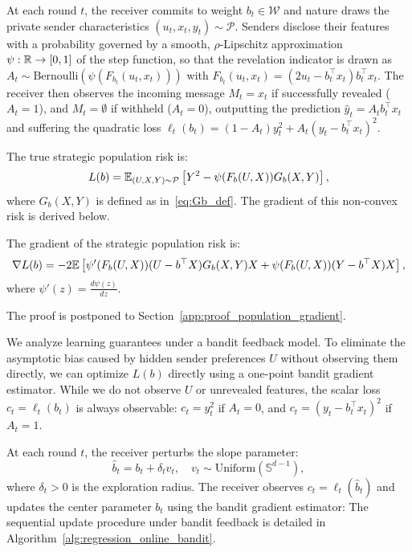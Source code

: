 At each round $t$, the receiver commits to weight $b_t \in \mathcal{W}$ and nature draws the private sender characteristics $(u_t, x_t, y_t) \sim \mathcal{P}$. Senders disclose their features with a probability governed by a smooth, $\rho$-Lipschitz approximation $\psi: \mathbb{R} \to [0, 1]$ of the step function, so that the revelation indicator is drawn as $A_t \sim \mathrm{Bernoulli}(\psi(F_{b_t}(u_t, x_t)))$ with $F_{b_t}(u_t, x_t) = (2u_t - b_t^\top x_t)b_t^\top x_t$. The receiver then observes the incoming message $M_t = x_t$ if successfully revealed ($A_t = 1$), and $M_t = \emptyset$ if withheld ($A_t = 0$), outputting the prediction $\hat{y}_t = A_t b_t^\top x_t$ and suffering the quadratic loss $\ell_t(b_t) = (1 - A_t)y_t^2 + A_t(y_t - b_t^\top x_t)^2$.


The true strategic population risk is:
\begin{equation}
    \label{eq:pop_risk_online}
    L(b) = \mathbb{E}_{(U,X,Y) \sim \mathcal{P}}\left[ Y^2 - \psi(F_b(U, X)) G_b(X, Y) \right],
\end{equation}
where $G_b(X, Y)$ is defined as in~\eqref{eq:Gb_def}. The gradient of this non-convex risk is derived below.
\begin{lemma}
\label{lem:population_gradient}
The gradient of the strategic population risk is:
\begin{equation}
    \label{eq:population_gradient}
    \nabla L(b) = -2 \mathbb{E}\left[ \psi'(F_b(U, X))(U - b^\top X) G_b(X, Y) X + \psi(F_b(U, X))(Y - b^\top X)X \right],
\end{equation}
where $\psi'(z) = \frac{d\psi(z)}{dz}$.
\end{lemma}
The proof is postponed to Section~\ref{app:proof_population_gradient}.

We analyze learning guarantees under a bandit feedback model. To eliminate the asymptotic bias caused by hidden sender preferences $U$ without observing them directly, we can optimize $L(b)$ directly using a one-point bandit gradient estimator. While we do not observe $U$ or unrevealed features, the scalar loss $c_t = \ell_t(b_t)$ is always observable: $c_t = y_t^2$ if $A_t = 0$, and $c_t = (y_t - b_t^\top x_t)^2$ if $A_t = 1$.

At each round $t$, the receiver perturbs the slope parameter:
\begin{equation}
    \label{eq:perturbed_parameter}
    \hat{b}_t = b_t + \delta_t v_t,
    \quad v_t \sim \text{Uniform}(\mathbb{S}^{d-1}),
\end{equation}
where $\delta_t > 0$ is the exploration radius. The receiver observes $c_t = \ell_t(\hat{b}_t)$ and updates the center parameter $b_t$ using the bandit gradient estimator:
The sequential update procedure under bandit feedback is detailed in Algorithm~\ref{alg:regression_online_bandit}.

